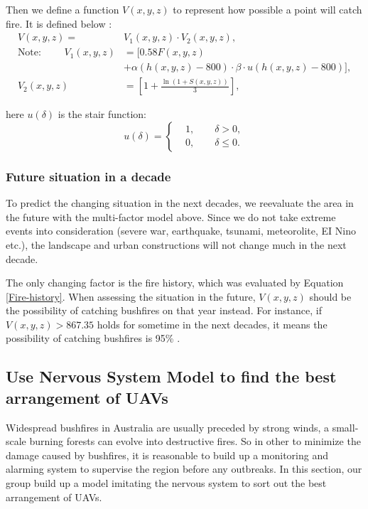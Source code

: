 \documentclass[13pt]{ctexart} %
\begin{document}
Then we define a function $V(x,y,z)$ to represent how possible a point will catch fire. It is defined below :
\begin{equation}\label{PossibilityFire}
    \begin{aligned}
        V(x,y,z) =& V_1(x,y,z)\cdot V_2(x,y,z), \\
        \text{Note: }\qquad V_1(x,y,z) &= [
            0.58 F(x,y,z)\\
           & +\alpha\left(
                h(x,y,z)-800
                 \right)\cdot
                 \beta\cdot u(h(x,y,z)-800)
            ], \\
        V_2(x,y,z) &=\left[
            1+\frac{\ln \left(1+S\left(x,y,z\right)\right)}{3}
            \right],
    \end{aligned}
\end{equation}

here $u(\delta)$ is the stair function:
\begin{equation}\label{Stair}%
    u(\delta)=
    \left\{
    \begin{aligned}
         & 1,\qquad \delta> 0,\\
         & 0,\qquad \delta\leq 0.
    \end{aligned}
    \right.
\end{equation}

\subsubsection{Future situation in a decade}
To predict the changing situation in the next decades, we reevaluate the area in the future with the multi-factor model above. Since we do not take extreme events into consideration (severe war, earthquake, tsunami, meteorolite, EI Nino etc.), the landscape and urban constructions will not change much in the next decade.

The only changing factor is the fire history, which was evaluated by Equation \ref{Fire-history}. When assessing the situation in the future, $V(x,y,z)$ should be the possibility of catching bushfires on that year instead. For instance, if $V(x,y,z)>867.35$ holds for sometime in the next decades, it means the possibility of catching bushfires is 95\% .


\subsection{Use Nervous System Model to find the best arrangement of UAVs}
Widespread bushfires in Australia are usually preceded by strong winds, a small-scale burning forests can evolve into destructive fires. So in other to minimize the damage caused by bushfires, it is reasonable to build up a monitoring and alarming system to supervise the region before any outbreaks. In this section, our group build up a model imitating the nervous system to sort out the best arrangement of UAVs.
\end{document}
